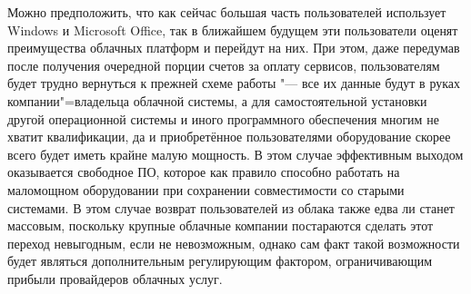 \documentclass[a5paper,10pt]{article}
\begin{document}
Можно предположить, что как сейчас большая часть пользователей использует Windows и Microsoft Office, так в ближайшем будущем эти пользователи оценят преимущества облачных платформ и перейдут на них. При этом, даже передумав после получения очередной порции счетов за оплату сервисов, пользователям будет трудно вернуться к прежней схеме работы "--- все их данные будут в руках компании"=владельца облачной системы, а для самостоятельной установки другой операционной системы и иного программного обеспечения многим не хватит квалификации, да и приобретённое пользователями оборудование скорее всего будет иметь крайне малую мощность. В этом случае эффективным выходом оказывается  свободное ПО, которое как правило способно работать на маломощном оборудовании при сохранении совместимости со старыми системами. В этом случае возврат пользователей из облака также едва ли станет массовым, поскольку крупные облачные компании постараются сделать этот переход невыгодным, если не невозможным, однако сам факт такой возможности будет являться дополнительным регулирующим фактором, ограничивающим прибыли провайдеров облачных услуг.
\end{document}
